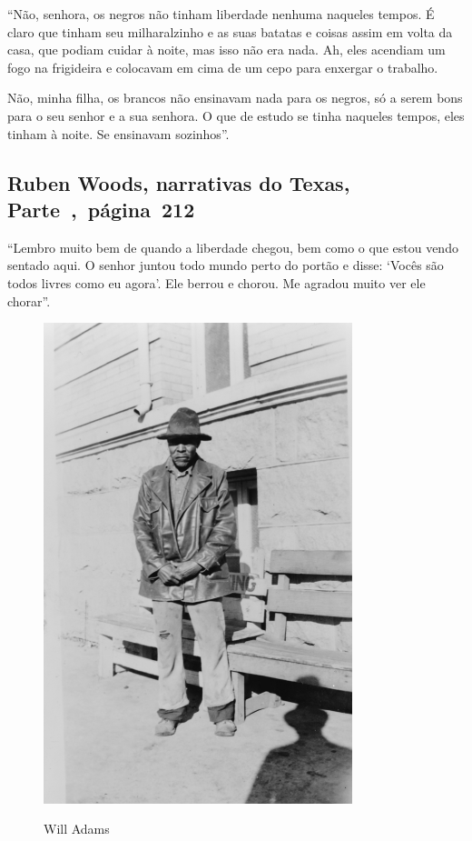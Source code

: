 ``Não, senhora, os negros não tinham liberdade nenhuma naqueles tempos.
É claro que tinham seu milharalzinho e as suas batatas e coisas assim em
volta da casa, que podiam cuidar à noite, mas isso não era nada. Ah,
eles acendiam um fogo na frigideira e colocavam em cima de um cepo para
enxergar o trabalho.

Não, minha filha, os brancos não ensinavam nada para os negros, só a
serem bons para o seu senhor e a sua senhora. O que de estudo se tinha
naqueles tempos, eles tinham à noite. Se ensinavam sozinhos''.

\subsection{Ruben Woods, narrativas do Texas, Parte~,~página~212}
\label{ref314}

``Lembro muito bem de quando a liberdade chegou, bem como o que estou
vendo sentado aqui. O senhor juntou todo mundo perto do portão e disse:
`Vocês são todos livres como eu agora'. Ele berrou e chorou. Me agradou
muito ver ele chorar''.

\begin{figure}[]
\centering
 \includegraphics[width=90mm]{./imgs/willadams_recorte.jpg} \label{img14}
\caption{Will Adams}
\end{figure}

